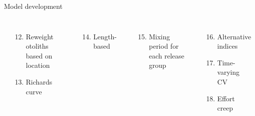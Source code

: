 \documentclass[aspectratio=169]{beamer}
\begin{document}
\begin{frame}{Model development}
\begin{columns}[T]
    \\[-0.8ex]
    \begin{enumerate}\setcounter{enumi}{11}
      \item Reweight otoliths based on location\\[-0.5ex]
      \item Richards curve\\[1.2ex]
    \end{enumerate}
    \\[-0.8ex]
    \begin{enumerate}\setcounter{enumi}{13}
      \item Length-based\\[1.2ex]
    \end{enumerate}
    \\[-0.8ex]
    \begin{enumerate}\setcounter{enumi}{14}
      \item Mixing period for each release group\\[1.2ex]
    \end{enumerate}
    \\[-0.8ex]
    \begin{enumerate}\setcounter{enumi}{15}
      \item Alternative indices\\[-0.5ex]
      \item Time-varying CV\\[-0.5ex]
      \item Effort creep
    \end{enumerate}
  \end{columns}
\end{frame}
\end{document}
